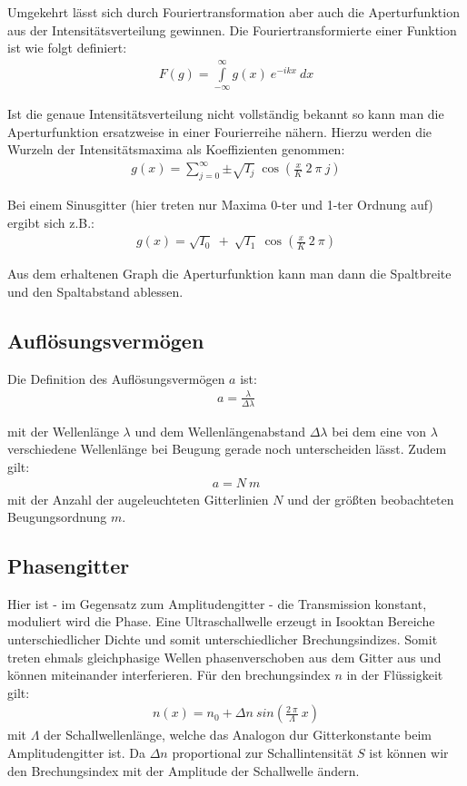 \documentclass[12pt]{article}
\begin{document}
Umgekehrt lässt sich durch Fouriertransformation aber auch die Aperturfunktion aus der Intensitätsverteilung gewinnen.
Die Fouriertransformierte einer Funktion ist wie folgt definiert:
\begin{align}
 F(g) = \int\limits_{-\infty}^{\infty}g(x)~e^{-ikx}~dx
\end{align}

Ist die genaue Intensitätsverteilung nicht vollständig bekannt so kann man die Aperturfunktion ersatzweise in einer Fourierreihe nähern.
Hierzu werden die Wurzeln der Intensitätsmaxima als Koeffizienten genommen:
\begin{align}
 g(x) = \sum_{j=0}^{\infty}{\pm \sqrt{I_j} \ \cos \left( \frac{x}{K} \ 2 \ \pi \ j \right) }
\end{align}

Bei einem Sinusgitter (hier treten nur Maxima 0-ter und 1-ter Ordnung auf) ergibt sich z.B.:
\begin{align*}
 g(x) = \sqrt{I_0} \ + \ \sqrt{I_1} \ \cos\left( \frac{x}{K} \ 2 \ \pi \right)
\end{align*}

Aus dem erhaltenen Graph die Aperturfunktion kann man dann die Spaltbreite und den Spaltabstand ablessen.

\subsection{Auflösungsvermögen}
Die Definition des Auflösungsvermögen $a$ ist:
\begin{align}
 a = \frac{\lambda}{\Delta\lambda}
\end{align}

mit der Wellenlänge $\lambda$ und dem Wellenlängenabstand $\Delta\lambda$ bei dem eine von $\lambda$ verschiedene Wellenlänge bei Beugung gerade noch
unterscheiden lässt. Zudem gilt:
\begin{align}
\label{auflösevermögen} a = N \ m
\end{align}
mit der Anzahl der augeleuchteten Gitterlinien $N$ und der größten beobachteten Beugungsordnung $m$.

\subsection{Phasengitter}
Hier ist - im Gegensatz zum Amplitudengitter - die Transmission konstant, moduliert wird die Phase.
Eine Ultraschallwelle erzeugt in Isooktan Bereiche unterschiedlicher Dichte und somit unterschiedlicher Brechungsindizes.
Somit treten ehmals gleichphasige Wellen phasenverschoben aus dem Gitter aus und können miteinander interferieren. Für den brechungsindex $n$ in der 
Flüssigkeit gilt:
\begin{align}
 n(x) = n_0 + \Delta n \ sin\left(\frac{2\ \pi}{\Lambda}\ x\right)
\end{align}
mit $\Lambda$ der Schallwellenlänge, welche das Analogon dur Gitterkonstante beim Amplitudengitter ist.
Da $\Delta n$ proportional zur Schallintensität $S$ ist können wir den Brechungsindex mit der Amplitude der Schallwelle ändern.
\end{document}

